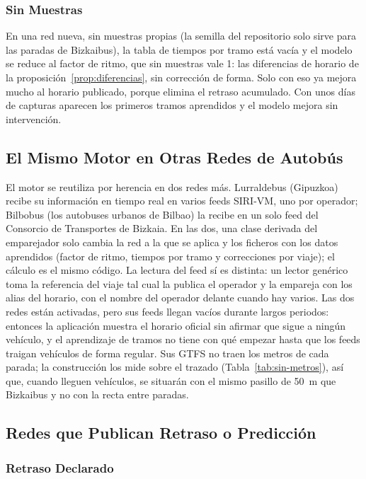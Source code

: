 \subsubsection{Sin Muestras} En una red nueva, sin muestras propias (la semilla del repositorio solo sirve para las
paradas de Bizkaibus), la tabla de tiempos por tramo está vacía y el modelo se reduce al factor de
ritmo, que sin muestras vale 1: las diferencias de horario de la proposición~\ref{prop:diferencias}, sin corrección de
forma. Solo con eso ya mejora mucho al horario publicado, porque elimina el retraso acumulado. Con unos días de capturas aparecen los
primeros tramos aprendidos y el modelo mejora sin intervención.

\subsection{El Mismo Motor en Otras Redes de Autobús}
\label{sec:lurraldebus}

El motor se reutiliza por herencia en dos redes más. Lurraldebus (Gipuzkoa) recibe su información en tiempo real en
varios feeds SIRI-VM, uno por operador; Bilbobus (los autobuses urbanos de Bilbao) la recibe en un solo feed del
Consorcio de Transportes de Bizkaia. En las dos, una clase derivada del emparejador solo cambia la red a la que se
aplica y los ficheros con los datos aprendidos (factor de ritmo, tiempos por tramo y correcciones por viaje); el
cálculo es el mismo código. La lectura del feed sí es distinta: un lector genérico toma la referencia del viaje tal
cual la publica el operador y la empareja con los alias del horario, con el nombre del operador delante cuando hay
varios. Las dos redes están activadas, pero sus feeds llegan vacíos durante largos periodos: entonces la aplicación
muestra el horario oficial sin afirmar que sigue a ningún vehículo, y el aprendizaje de tramos no tiene con qué
empezar hasta que los feeds traigan vehículos de forma regular. Sus GTFS no traen los metros de cada parada; la
construcción los mide sobre el trazado (Tabla~\ref{tab:sin-metros}), así que, cuando lleguen vehículos, se situarán
con el mismo pasillo de 50~m que Bizkaibus y no con la recta entre paradas.

\subsection{Redes que Publican Retraso o Predicción}
\label{sec:otras-redes}

\subsubsection*{Retraso Declarado}

